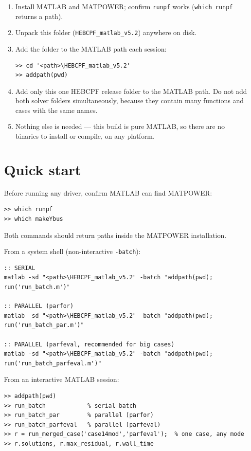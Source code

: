\documentclass[11pt,a4paper]{article}
\newcommand{\code}[1]{\texttt{#1}}
\begin{document}
\begin{enumerate}[leftmargin=1.6em]
  \item Install MATLAB and MATPOWER; confirm \code{runpf} works
        (\code{which runpf} returns a path).
  \item Unpack this folder (\code{HEBCPF_matlab_v5.2}) anywhere on disk.
  \item Add the folder to the MATLAB path each session:
\begin{lstlisting}
>> cd '<path>\HEBCPF_matlab_v5.2'
>> addpath(pwd)
\end{lstlisting}
  \item Add only this one HEBCPF release folder to the MATLAB path. Do not add both
        solver folders simultaneously, because they contain many functions and cases with
        the same names.
  \item Nothing else is needed --- this build is pure MATLAB, so there are no binaries to
        install or compile, on any platform.
\end{enumerate}

\section{Quick start}

Before running any driver, confirm MATLAB can find MATPOWER:
\begin{lstlisting}[style=mat]
>> which runpf
>> which makeYbus
\end{lstlisting}
Both commands should return paths inside the MATPOWER installation.

From a system shell (non-interactive \code{-batch}):
\begin{lstlisting}[style=sh]
:: SERIAL
matlab -sd "<path>\HEBCPF_matlab_v5.2" -batch "addpath(pwd); run('run_batch.m')"

:: PARALLEL (parfor)
matlab -sd "<path>\HEBCPF_matlab_v5.2" -batch "addpath(pwd); run('run_batch_par.m')"

:: PARALLEL (parfeval, recommended for big cases)
matlab -sd "<path>\HEBCPF_matlab_v5.2" -batch "addpath(pwd); run('run_batch_parfeval.m')"
\end{lstlisting}

From an interactive MATLAB session:
\begin{lstlisting}[style=mat]
>> addpath(pwd)
>> run_batch            % serial batch
>> run_batch_par        % parallel (parfor)
>> run_batch_parfeval   % parallel (parfeval)
>> r = run_merged_case('case14mod','parfeval');  % one case, any mode
>> r.solutions, r.max_residual, r.wall_time
\end{lstlisting}
\end{document}
